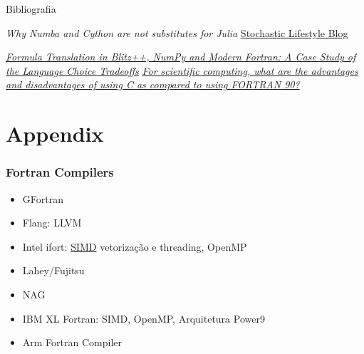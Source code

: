 \documentclass{beamer}
\begin{document}
\begin{darkframes}
\begin{frame}[label=bibliography, allowframebreaks]{Bibliografia}
{\begin{thebibliography}{99}
     \emph{Why Numba and Cython are not substitutes for Julia} \hyperlink{http://www.stochasticlifestyle.com/why-numba-and-cython-are-not-substitutes-for-julia}{Stochastic Lifestyle Blog}
    
     \hyperlink{https://www.hindawi.com/journals/sp/2014/870146/abs/}{\emph{Formula Translation in Blitz++, NumPy and Modern Fortran: A Case Study of the Language Choice Tradeoffs}}
     \hyperlink{https://www.quora.com/For-scientific-computing-what-are-the-advantages-and-disadvantages-of-using-C-as-compared-to-using-FORTRAN-90}{\emph{For scientific computing, what are the advantages and disadvantages of using C as compared to using FORTRAN 90?}}
    \end{thebibliography}
    }
  \end{frame}
  
  \section{Appendix}
  
  \begin{frame}[label=compilers]
    \frametitle{Fortran Compilers}
    \begin{itemize}
    \item GFortran
    \item Flang: LLVM
    \item Intel ifort: \href{https://en.wikipedia.org/wiki/SIMD}{SIMD} vetorização e threading, OpenMP
    \item Lahey/Fujitsu
    \item NAG
    \item IBM XL Fortran: SIMD, OpenMP, Arquitetura Power9
    \item Arm Fortran Compiler
    \end{itemize}
    \hyperlink{features}{}
    \addtocounter{framenumber}{-1}
  \end{frame}
  

\end{darkframes}
\end{document}

